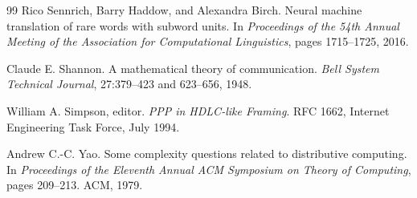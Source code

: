 \documentclass[11pt,a4paper]{article}
\theoremstyle{remark}\newtheorem{remark}[definition]{Remark}
\begin{document}
\begin{thebibliography}{99}
Rico Sennrich, Barry Haddow, and Alexandra Birch.
\newblock Neural machine translation of rare words with subword units.
\newblock In \emph{Proceedings of the 54th Annual Meeting of the Association for Computational Linguistics}, pages 1715--1725, 2016.

Claude E. Shannon.
\newblock A mathematical theory of communication.
\newblock \emph{Bell System Technical Journal}, 27:379--423 and 623--656, 1948.

William A. Simpson, editor.
\newblock \emph{PPP in HDLC-like Framing}.
\newblock RFC 1662, Internet Engineering Task Force, July 1994.

Andrew C.-C. Yao.
\newblock Some complexity questions related to distributive computing.
\newblock In \emph{Proceedings of the Eleventh Annual ACM Symposium on Theory of Computing}, pages 209--213. ACM, 1979.

\end{thebibliography}
\end{document}
